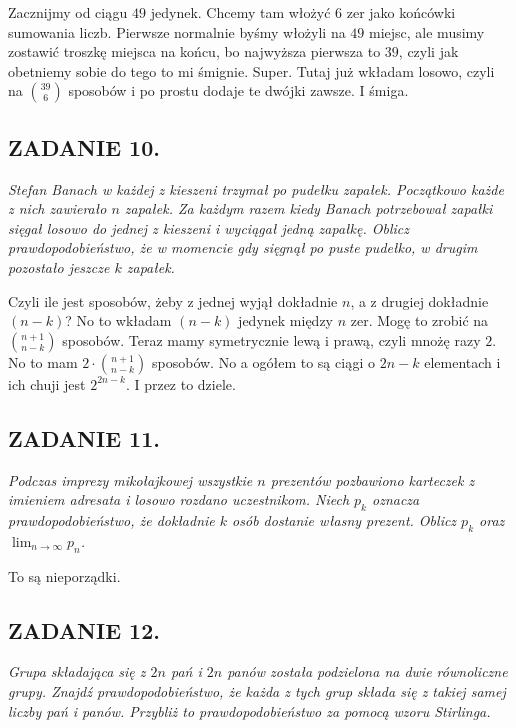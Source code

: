 \documentclass{article}
\begin{document}
Zacznijmy od ciągu $49$ jedynek. Chcemy tam włożyć $6$ zer jako końcówki sumowania liczb. Pierwsze normalnie byśmy włożyli na $49$ miejsc, ale musimy zostawić troszkę miejsca na końcu, bo najwyższa pierwsza to $39$, czyli jak obetniemy sobie do tego to mi śmignie. Super. Tutaj już wkładam losowo, czyli na ${39\choose 6}$ sposobów i po prostu dodaje te dwójki zawsze. I śmiga.

\subsection*{ZADANIE 10.}
\emph{Stefan Banach w każdej z kieszeni trzymał po pudełku zapałek. Początkowo każde z nich zawierało $n$ zapałek. Za każdym razem kiedy Banach potrzebował zapałki sięgał losowo do jednej z kieszeni i wyciągał jedną zapałkę. Oblicz prawdopodobieństwo, że w momencie gdy sięgnął po puste pudełko, w drugim pozostało jeszcze $k$ zapałek.}
\smallskip

Czyli ile jest sposobów, żeby z jednej wyjął dokładnie $n$, a z drugiej dokładnie $(n-k)$? No to wkładam $(n-k)$ jedynek między $n$ zer. Mogę to zrobić na ${n+1\choose n-k}$ sposobów. Teraz mamy symetrycznie lewą i prawą, czyli mnożę razy $2$. No to mam $2\cdot{n+1\choose n-k}$ sposobów. No a ogółem to są ciągi o $2n-k$ elementach i ich chuji jest $2^{2n-k}$. I przez to dziele.

\subsection*{ZADANIE 11.}
\emph{Podczas imprezy mikołajkowej wszystkie $n$ prezentów pozbawiono karteczek z imieniem adresata i losowo rozdano uczestnikom. Niech $p_k$ oznacza prawdopodobieństwo, że dokładnie $k$ osób dostanie własny prezent. Oblicz $p_k$ oraz $\lim_{n\to\infty}p_n$.}
\smallskip

To są nieporządki.

\subsection*{ZADANIE 12.}
\emph{Grupa składająca się z $2n$ pań i $2n$ panów została podzielona na dwie równoliczne grupy. Znajdź prawdopodobieństwo, że każda z tych grup składa się z takiej samej liczby pań i panów. Przybliż to prawdopodobieństwo za pomocą wzoru Stirlinga.}
\medskip
\end{document}
